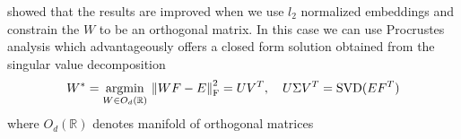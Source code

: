 \begin{itemize}
	
	
	\cite{xing2015normalized} showed that the results are improved when we use $l_2$ normalized embeddings and constrain the ${W}$ to be an orthogonal matrix. In this case we can use Procrustes analysis which advantageously offers a closed form solution obtained from the singular value decomposition 
	\[W^* = \underset{W \in O_d(\mathbb{R})}{\operatorname{argmin}} {\ \lVert WF - E \rVert}_{\text{F}}^2 = UV^T , \quad U\Sigma V^T = \text{SVD}(EF^T) \]
	where $ O_d(\mathbb{R})$ denotes manifold of orthogonal matrices 
\end{itemize}


\[ \]





%

